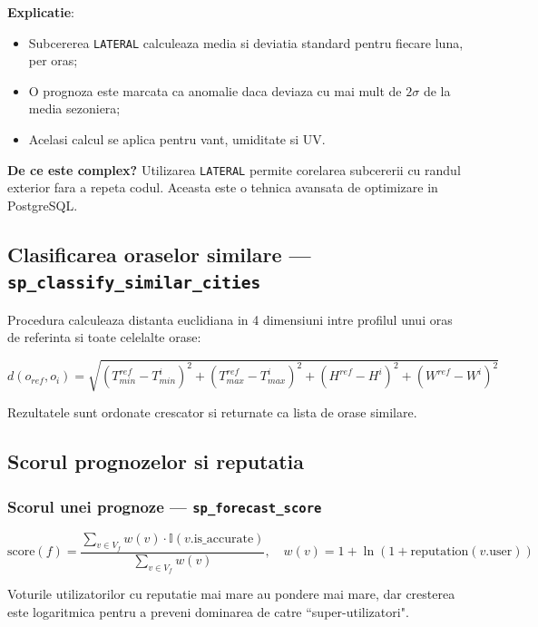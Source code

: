 \documentclass[12pt,a4paper]{article}
\begin{document}
\textbf{Explicatie}:
\begin{itemize}
    \item Subcererea \texttt{LATERAL} calculeaza media si deviatia standard pentru fiecare luna, per oras;
    \item O prognoza este marcata ca anomalie daca deviaza cu mai mult de $2\sigma$ de la media sezoniera;
    \item Acelasi calcul se aplica pentru vant, umiditate si UV.
\end{itemize}

\textbf{De ce este complex?} Utilizarea \texttt{LATERAL} permite corelarea subcererii cu randul exterior fara a repeta codul. Aceasta este o tehnica avansata de optimizare in PostgreSQL.

\subsection{Clasificarea oraselor similare --- \texttt{sp\_classify\_similar\_cities}}

Procedura calculeaza distanta euclidiana in 4 dimensiuni intre profilul unui oras de referinta si toate celelalte orase:

\begin{equation}
d(o_{ref}, o_i) = \sqrt{(T_{min}^{ref} - T_{min}^{i})^2 + (T_{max}^{ref} - T_{max}^{i})^2 + (H^{ref} - H^{i})^2 + (W^{ref} - W^{i})^2}
\end{equation}

Rezultatele sunt ordonate crescator si returnate ca lista de orase similare.

\subsection{Scorul prognozelor si reputatia}

\subsubsection{Scorul unei prognoze --- \texttt{sp\_forecast\_score}}

\begin{equation}
\text{score}(f) = \frac{\sum_{v \in V_f} w(v) \cdot \mathbb{I}(v.\text{is\_accurate})}{\sum_{v \in V_f} w(v)}, \quad w(v) = 1 + \ln(1 + \text{reputation}(v.\text{user}))
\end{equation}

Voturile utilizatorilor cu reputatie mai mare au pondere mai mare, dar cresterea este logaritmica pentru a preveni dominarea de catre ``super-utilizatori".
\end{document}
